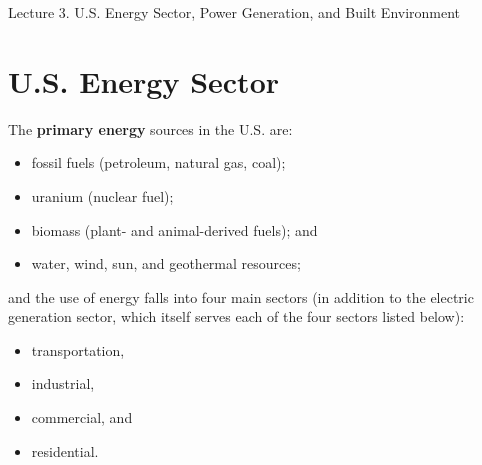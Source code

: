 \documentclass[10pt]{article}
\begin{document}
   \noindent
   \begin{center}

   \hrulefill
   
   \vspace{5pt}
   
   \vspace{0pt}
   
   {\Large \hfill  Lecture 3. U.S. Energy Sector, Power Generation, and Built Environment}
   \vspace{5pt}
   
  
   \hrulefill
   \end{center}
   
{}





\section{U.S. Energy Sector}
The \textbf{primary energy} sources in the U.S. are:

\begin{itemize}
    \item fossil fuels (petroleum, natural gas, coal);
    \item uranium (nuclear fuel); 
    \item biomass (plant- and animal-derived fuels); and
    \item water, wind, sun, and geothermal resources;
\end{itemize}


and the use of energy falls into four main sectors (in addition to the electric generation sector, which itself serves each of the four sectors listed below):

\begin{itemize}
    \item transportation,
    \item industrial, 
    \item commercial, and
    \item residential.
\end{itemize}
\end{document}
